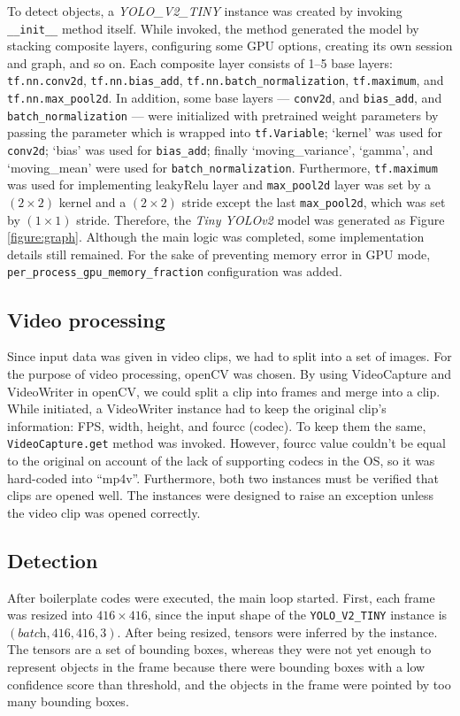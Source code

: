 \documentclass[a4paper,12pt]{article}
\begin{document}
To detect objects, a \emph{YOLO\_V2\_TINY} instance was created by invoking \lstinline{__init__} method itself. While invoked, the method generated the model by stacking composite layers, configuring some GPU options, creating its own session and graph, and so on. 
Each composite layer consists of 1--5 base layers: \lstinline{tf.nn.conv2d}, \lstinline{tf.nn.bias_add}, \lstinline{tf.nn.batch_normalization}, \lstinline{tf.maximum}, and \lstinline{tf.nn.max_pool2d}.
In addition, some base layers --- \lstinline{conv2d}, and \lstinline{bias_add}, and \lstinline{batch_normalization} --- were initialized with pretrained weight parameters by passing the parameter which is wrapped into \lstinline{tf.Variable};
‘kernel’ was used for \lstinline{conv2d}; 
‘bias’ was used for \lstinline{bias_add};
finally ‘moving\_variance’, ‘gamma’, and ‘moving\_mean’ were used for \lstinline{batch_normalization}. Furthermore, \lstinline{tf.maximum} was used for implementing leakyRelu layer and \lstinline{max_pool2d} layer was set by a $(2 \times 2)$ kernel and a $(2 \times 2)$ stride except the last \lstinline{max_pool2d}, which was set by $(1 \times 1)$ stride. Therefore, the \emph{Tiny YOLOv2} model was generated as Figure \ref{figure:graph}.
Although the main logic was completed, some implementation details still remained. For the sake of preventing memory error in GPU mode, \lstinline{per_process_gpu_memory_fraction} configuration was added.

\subsection{Video processing}
Since input data was given in video clips, we had to split into a set of images. For the purpose of video processing, openCV was chosen. By using VideoCapture and VideoWriter in openCV, we could split a clip into frames and merge into a clip. While initiated, a VideoWriter instance had to keep the original clip’s information: FPS, width, height, and fourcc (codec). To keep them the same, \lstinline{VideoCapture.get} method was invoked. However, fourcc value couldn’t be equal to the original on account of the lack of supporting codecs in the OS, so it was hard-coded into “mp4v”.
Furthermore, both two instances must be verified that clips are opened well. The instances were designed to raise an exception unless the video clip was opened correctly.

\subsection{Detection}
After boilerplate codes were executed, the main loop started.
 First, each frame was resized into $416 \times 416$, since the input shape of the \lstinline{YOLO_V2_TINY} instance is $(\textit{batch}, 416, 416, 3)$.
 After being resized, tensors were inferred by the instance.
 The tensors are a set of bounding boxes, whereas they were not yet enough to represent objects in the frame because there were bounding boxes with a low confidence score than threshold, and the objects in the frame were pointed by too many bounding boxes.
\end{document}
